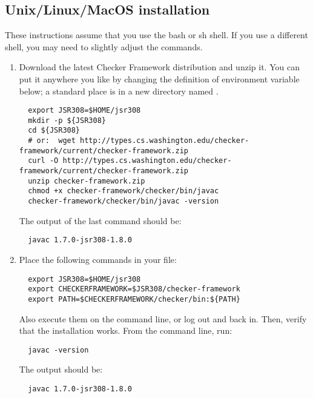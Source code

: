\subsection{Unix/Linux/MacOS installation\label{unix-installation}}

These instructions assume that you use the bash or sh shell.  If you use a
different shell, you may need to slightly adjust the commands.

\begin{enumerate}

\item
  Download the latest Checker Framework distribution
  and unzip it.  You can put it anywhere you like by changing the
  definition of environment variable  below; a standard place
  is in a
  new directory named .

\begin{Verbatim}
  export JSR308=$HOME/jsr308
  mkdir -p ${JSR308}
  cd ${JSR308}
  # or:  wget http://types.cs.washington.edu/checker-framework/current/checker-framework.zip
  curl -O http://types.cs.washington.edu/checker-framework/current/checker-framework.zip
  unzip checker-framework.zip
  chmod +x checker-framework/checker/bin/javac
  checker-framework/checker/bin/javac -version
\end{Verbatim}

The output of the last command should be:

\begin{Verbatim}
  javac 1.7.0-jsr308-1.8.0
\end{Verbatim}


\item
  Place the following commands in your  file:
\begin{Verbatim}
  export JSR308=$HOME/jsr308
  export CHECKERFRAMEWORK=$JSR308/checker-framework
  export PATH=$CHECKERFRAMEWORK/checker/bin:${PATH}
\end{Verbatim}


Also execute them on the command line, or log out and back in.  Then,
verify that the installation works.  From the command line, run:

\begin{Verbatim}
  javac -version
\end{Verbatim}

The output should be:

\begin{Verbatim}
  javac 1.7.0-jsr308-1.8.0
\end{Verbatim}

\end{enumerate}

